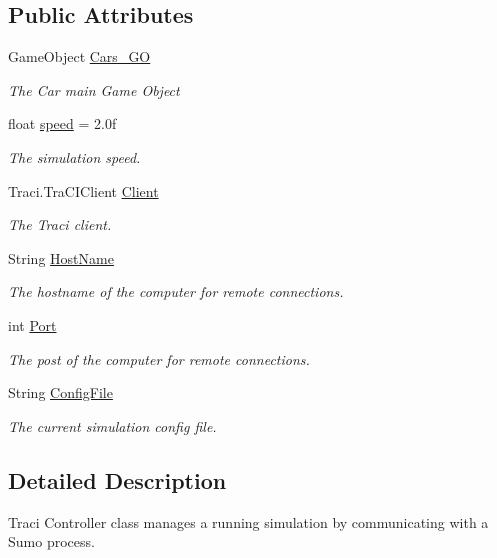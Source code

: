 \subsection*{Public Attributes}
\begin{DoxyCompactItemize}
\item 
Game\+Object \mbox{\hyperlink{class_traci_controller_a29b2da0a754eabda5002fad9b07213c6}{Cars\+\_\+\+GO}}
\begin{DoxyCompactList}\small\item\em The Car main Game Object \end{DoxyCompactList}\item 
float \mbox{\hyperlink{class_traci_controller_abc82770640e1620b43607ad292e97f4e}{speed}} = 2.\+0f
\begin{DoxyCompactList}\small\item\em The simulation speed. \end{DoxyCompactList}\item 
Traci.\+Tra\+C\+I\+Client \mbox{\hyperlink{class_traci_controller_a2ad927f803db7f58f36623b8c7e4cbf8}{Client}}
\begin{DoxyCompactList}\small\item\em The Traci client. \end{DoxyCompactList}\item 
String \mbox{\hyperlink{class_traci_controller_aed0a2042d258363ec5726b8b7c9e40b3}{Host\+Name}}
\begin{DoxyCompactList}\small\item\em The hostname of the computer for remote connections. \end{DoxyCompactList}\item 
int \mbox{\hyperlink{class_traci_controller_a480600f51cbbd8506fbdca8fd3179cb3}{Port}}
\begin{DoxyCompactList}\small\item\em The post of the computer for remote connections. \end{DoxyCompactList}\item 
String \mbox{\hyperlink{class_traci_controller_a333aa35fec78296dc265107576c8dcda}{Config\+File}}
\begin{DoxyCompactList}\small\item\em The current simulation config file. \end{DoxyCompactList}\end{DoxyCompactItemize}


\subsection{Detailed Description}
Traci Controller class manages a running simulation by communicating with a Sumo process. 



